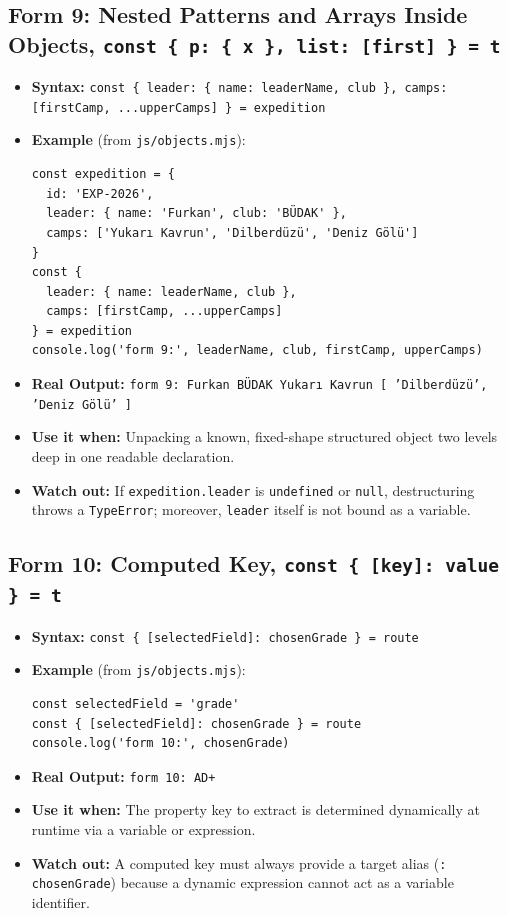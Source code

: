 \documentclass[11pt, a4paper]{article}
\begin{document}
\subsection{Form 9: Nested Patterns and Arrays Inside Objects, \texttt{const \{ p: \{ x \}, list: [first] \} = t}}
\begin{itemize}
  \item \textbf{Syntax:} \texttt{const \{ leader: \{ name: leaderName, club \}, camps: [firstCamp, ...upperCamps] \} = expedition}
  \item \textbf{Example} (from \texttt{js/objects.mjs}):
\begin{lstlisting}
const expedition = {
  id: 'EXP-2026',
  leader: { name: 'Furkan', club: 'BÜDAK' },
  camps: ['Yukarı Kavrun', 'Dilberdüzü', 'Deniz Gölü']
}
const {
  leader: { name: leaderName, club },
  camps: [firstCamp, ...upperCamps]
} = expedition
console.log('form 9:', leaderName, club, firstCamp, upperCamps)
\end{lstlisting}
  \item \textbf{Real Output:} \texttt{form 9: Furkan BÜDAK Yukarı Kavrun [ 'Dilberdüzü', 'Deniz Gölü' ]}
  \item \textbf{Use it when:} Unpacking a known, fixed-shape structured object two levels deep in one readable declaration.
  \item \textbf{Watch out:} If \texttt{expedition.leader} is \texttt{undefined} or \texttt{null}, destructuring throws a \texttt{TypeError}; moreover, \texttt{leader} itself is not bound as a variable.
\end{itemize}

\subsection{Form 10: Computed Key, \texttt{const \{ [key]: value \} = t}}
\begin{itemize}
  \item \textbf{Syntax:} \texttt{const \{ [selectedField]: chosenGrade \} = route}
  \item \textbf{Example} (from \texttt{js/objects.mjs}):
\begin{lstlisting}
const selectedField = 'grade'
const { [selectedField]: chosenGrade } = route
console.log('form 10:', chosenGrade)
\end{lstlisting}
  \item \textbf{Real Output:} \texttt{form 10: AD+}
  \item \textbf{Use it when:} The property key to extract is determined dynamically at runtime via a variable or expression.
  \item \textbf{Watch out:} A computed key must always provide a target alias (\texttt{: chosenGrade}) because a dynamic expression cannot act as a variable identifier.
\end{itemize}
\end{document}
